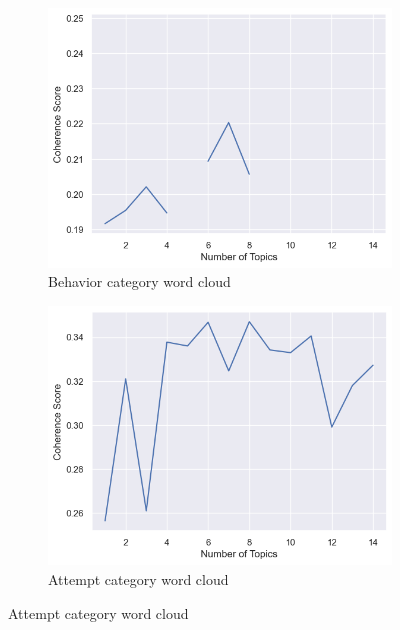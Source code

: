 \documentclass[sn-mathphys,Numbered]{sn-jnl}%
\theoremstyle{thmstyleone}%
\theoremstyle{thmstyletwo}%
\theoremstyle{thmstylethree}%
\begin{document}
\begin{figure}[h!]
\begin{subfigure}{0.45\textwidth}
    \label{twitterdist}
\end{subfigure}      
\centering
\begin{subfigure}{0.45\textwidth}
    \includegraphics[width=\textwidth]{cv_behavior.png}
    \caption{Behavior category word cloud}
    \label{redditdist}
\end{subfigure}
\hfill
\begin{subfigure}{0.45\textwidth}
    \includegraphics[width=\textwidth]{cv_attempt.png}
    \caption{Attempt category word cloud}
    \label{twitterdist}
\end{subfigure}   
\label{redditdist_twitterdist}
\end{figure}
\end{document}
